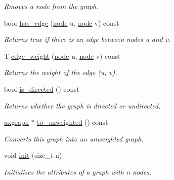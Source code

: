 \begin{DoxyCompactItemize}
\begin{DoxyCompactList}\small\item\em Rmoves a node from the graph. \end{DoxyCompactList}\item 
bool \hyperlink{classlgraph_1_1utils_1_1wugraph_a5d729aece87dbda408211b12ad4856d1}{has\-\_\-edge} (\hyperlink{namespacelgraph_1_1utils_a7bd66ede3805ef121bc2835bd48de0cf}{node} u, \hyperlink{namespacelgraph_1_1utils_a7bd66ede3805ef121bc2835bd48de0cf}{node} v) const 
\begin{DoxyCompactList}\small\item\em Returns true if there is an edge between nodes {\itshape u} and {\itshape v}. \end{DoxyCompactList}\item 
T \hyperlink{classlgraph_1_1utils_1_1wugraph_ace598c9cb108806a2a9a6ff4219377de}{edge\-\_\-weight} (\hyperlink{namespacelgraph_1_1utils_a7bd66ede3805ef121bc2835bd48de0cf}{node} u, \hyperlink{namespacelgraph_1_1utils_a7bd66ede3805ef121bc2835bd48de0cf}{node} v) const 
\begin{DoxyCompactList}\small\item\em Returns the weight of the edge ({\itshape u}, {\itshape v}). \end{DoxyCompactList}\item 
bool \hyperlink{classlgraph_1_1utils_1_1wugraph_a3ed8cd6b1d499fd3f36ec6c1cb2845d3}{is\-\_\-directed} () const 
\begin{DoxyCompactList}\small\item\em Returns whether the graph is directed or undirected. \end{DoxyCompactList}\item 
\hyperlink{classlgraph_1_1utils_1_1uxgraph}{uxgraph} $\ast$ \hyperlink{classlgraph_1_1utils_1_1wugraph_af676d6286e785daa94bee87f913f2af4}{to\-\_\-unweighted} () const 
\begin{DoxyCompactList}\small\item\em Converts this graph into an unweighted graph. \end{DoxyCompactList}\item 
void \hyperlink{classlgraph_1_1utils_1_1wxgraph_a566ae9fe69209230ef159ed350ab8f7f}{init} (size\-\_\-t n)
\begin{DoxyCompactList}\small\item\em Initialises the attributes of a graph with {\itshape n} nodes. \end{DoxyCompactList}\item 

\end{DoxyCompactItemize}
